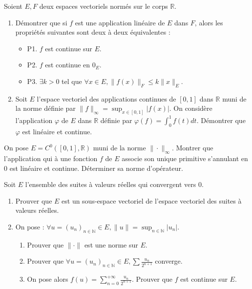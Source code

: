 \begin{exercice}
Soient $E, F$ deux espaces vectoriels normés sur le corps $\mathbb{R}$.
\begin{enumerate}
    \item Démontrer que si $f$ est une application linéaire de $E$ dans $F$, alors les propriétés suivantes sont deux à deux équivalentes :
    \begin{itemize}
        \item P1. $f$ est continue sur $E$.
        \item P2. $f$ est continue en $0_{E}$.
        \item P3. $\exists k > 0$ tel que $\forall x \in E, \|f(x)\|_{F} \le k \|x\|_{E}$.
    \end{itemize}
    \item Soit $E$ l'espace vectoriel des applications continues de $[0,1]$ dans $\mathbb{R}$ muni de la norme définie par $\|f\|_{\infty} = \sup_{x \in [0,1]} |f(x)|$. On considère l'application $\varphi$ de $E$ dans $\mathbb{R}$ définie par $\varphi(f) = \int_{0}^{1} f(t) dt$. Démontrer que $\varphi$ est linéaire et continue.
\end{enumerate}
\end{exercice}

\begin{exercice}
On pose $E=C^{0}([0,1], \mathbb{R})$ muni de la norme $\|\cdot\|_{\infty}$.
Montrer que l'application qui à une fonction $f$ de $E$ associe son unique primitive s'annulant en 0 est linéaire et continue. Déterminer sa norme d'opérateur.
\end{exercice}

\begin{exercice}
Soit $E$ l'ensemble des suites à valeurs réelles qui convergent vers 0.
\begin{enumerate}
    \item Prouver que $E$ est un sous-espace vectoriel de l'espace vectoriel des suites à valeurs réelles.
    \item On pose : $\forall u=(u_{n})_{n \in \mathbb{N}} \in E, \|u\| = \sup_{n \in \mathbb{N}} |u_{n}|$.
    \begin{enumerate}
        \item Prouver que $\|\cdot\|$ est une norme sur $E$.
        \item Prouver que $\forall u=(u_{n})_{n \in \mathbb{N}} \in E, \sum \frac{u_{n}}{2^{n+1}}$ converge.
        \item On pose alors $f(u) = \sum_{n=0}^{+\infty} \frac{u_{n}}{2^{n+1}}$. Prouver que $f$ est continue sur $E$.
    \end{enumerate}
\end{enumerate}
\end{exercice}

